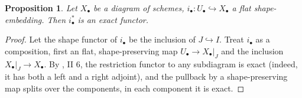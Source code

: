 \documentclass{report}
\newtheorem{prop}[theorem]{Proposition}
\theoremstyle{definition}
\begin{document}
\begin{prop}
	Let $X_\bullet$ be a diagram of schemes, $i_\bullet : U_\bullet \hookrightarrow X_\bullet$ a flat shape-embedding.
	Then $i_\bullet^*$ is an exact functor.
\end{prop}
\begin{proof}
	Let the shape functor of $i_\bullet$ be the inclusion of $J \hookrightarrow I$.
	Treat $i_\bullet$ as a composition, first an flat, shape-preserving map $U_\bullet \rightarrow X_\bullet|_J$ and the inclusion $X_\bullet|_J \rightarrow X_\bullet$.
	By \cite{Lipman2009}, II 6, the restriction functor to any subdiagram is exact (indeed, it has both a left and a right adjoint), and the pullback by a shape-preserving map splits over the components, in each component it is exact.
\end{proof}
\end{document}
